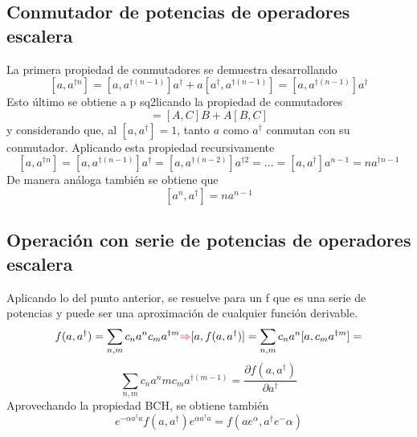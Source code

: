 \documentclass{book}
\begin{document}
    \subsection{Conmutador de potencias de operadores escalera} La primera propiedad de conmutadores se demuestra desarrollando
    \begin{equation}{ [a,a^{\dag n}]=[a,a^{\dag(n-1)}]a^\dag+a[a^\dag,a^{\dag(n-1)}]=[a,a^{\dag(n-1)}]a^\dag} \end{equation}
    Esto último se obtiene a p sq2licando la propiedad de conmutadores \begin{equation}[A,BC]=[A,C]B+A[B,C]\end{equation} y considerando que, al ${[a,a^\dag]=1}$, tanto ${a}$ como ${a^\dag}$ conmutan con su conmutador. Aplicando esta propiedad recursivamente
    \begin{equation}{ [a,a^{\dag n}]=[a,a^{\dag (n-1)}]a^\dag=[a,a^{\dag (n-2)}]a^{\dag 2}=...=[a,a^{\dag}]a^{n-1}=na^{\dag n-1}} \end{equation}
    De manera análoga también se obtiene que 
    \begin{equation}{[a^n, a^\dag]=na^{n-1}} \end{equation}
    \subsection{Operación con serie de potencias de operadores escalera} Aplicando lo del punto anterior, se resuelve para un f que es una serie de potencias y puede ser una aproximación de cualquier función derivable. 
    \begin{equation}{ f(a,a^\dag)=\sum_{n,m} c_n a^n c_m a^{\dag m}\textcolor{red}{\Rightarrow} [a, f(a, a^\dag)]=\sum_{n,m} c_n a^n [a,c_m a^{\dag m}]=} \end{equation} \begin{equation}{\sum_{n,m} c_n a^n m c_m a^{\dag (m-1)}=\frac{\partial f(a,a^{\dag})}{\partial a^\dag}} \end{equation} Aprovechando la propiedad BCH, se obtiene también
    \begin{equation}{ e^{-\alpha a^\dag a}f(a, a^\dag)e^{\alpha a^\dag a}=f(ae^\alpha,a^\dag e^-\alpha)} \end{equation}
\end{document}
